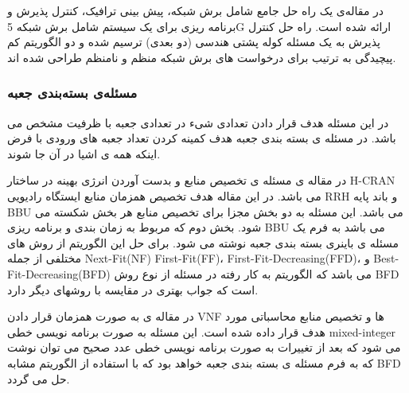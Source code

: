 در مقاله‌ی
\cite{sciancalepore2017mobile}
یک راه حل جامع شامل برش شبکه، پیش بینی ترافیک، کنترل پذیرش و برنامه ریزی برای یک سیستم شامل برش شبکه 5G ارائه شده است.
راه حل کنترل پذیرش به یک مسئله کوله پشتی هندسی (دو بعدی) ترسیم شده و دو الگوریتم کم پیچیدگی به ترتیب برای درخواست های برش شبکه منظم و نامنظم طراحی شده اند.
\subsubsection{مسئله‌ی بسته‌بندی جعبه}
 در این مسئله هدف قرار دادن تعدادی شیء در تعدادی جعبه با ظرفیت مشخص می باشد.
در مسئله ی بسته بندی جعبه 
هدف کمینه کردن تعداد جعبه های ورودی با فرض اینکه همه ی اشیا در آن جا شوند.

در مقاله ی
\citep{wang2017joint}
مسئله ی تخصیص منابع و بدست آوردن انرژی بهینه در ساختار
H-CRAN
می باشد.
در این مقاله هدف تخصیص همزمان منابع ایستگاه رادیویی RRH و باند پایه BBU می باشد.
این مسئله به دو بخش مجزا برای تخصیص منابع هر بخش شکسته می شود.
بخش دوم که مربوط به زمان بندی و برنامه ریزی BBU می باشد به فرم یک مسئله ی باینری بسته بندی جعبه نوشته می شود.
برای حل این الگوریتم از روش های مختلفی از جمله
Next-Fit(NF)
First-Fit(FF)،
First-Fit-Decreasing(FFD)،
و
‌Best-Fit-Decreasing(BFD)
می باشد که الگوریتم به کار رفته در مسئله از نوع روش
BFD 
 است که جواب بهتری در مقایسه با روشهای دیگر دارد.  
 
در مقاله ی
\cite{de2020optimal}
به صورت همزمان قرار دادن VNF ها و تخصیص منابع محاسباتی مورد هدف قرار داده شده است.
این مسئله به صورت
برنامه نویسی خطی 
mixed-integer
می شود که بعد از تغییرات به صورت برنامه نویسی خطی عدد صحیح می توان نوشت که به فرم مسئله ی بسته بندی جعبه خواهد بود که با استفاده از الگوریتم مشابه
BFD حل می گردد.
